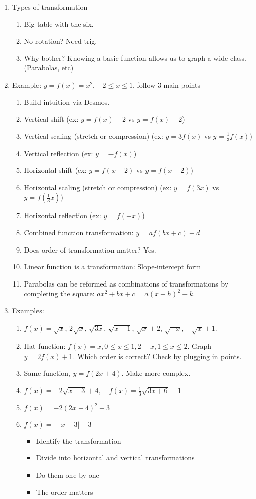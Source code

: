 \documentclass{article}
\begin{document}
\begin{enumerate}
\item Types of transformation
\begin{enumerate}
\item Big table with the six.
\item No rotation? Need trig.
\item Why bother? Knowing a basic function allows us to graph a wide class. (Parabolas, etc)
\end{enumerate}

\item Example: $y=f(x)=x^2$, $-2\leq x \leq 1$, follow 3 main points
\begin{enumerate}
\item Build intuition via Desmos. 
\item Vertical shift (ex: $y=f(x)-2$ vs $y=f(x)+2$)
\item Vertical scaling (stretch or compression) (ex: $y=3f(x)$ vs $y=\frac{1}{3}f(x)$)
\item Vertical reflection (ex: $y=-f(x)$)
\item Horizontal shift (ex: $y=f(x-2)$ vs $y=f(x+2)$)
\item Horizontal scaling (stretch or compression) (ex: $y=f(3x)$ vs $y=f(\frac{1}{3}x)$)
\item Horizontal reflection (ex: $y=f(-x)$)
\item Combined function transformation: $y=af(bx+c)+d$
\item Does order of transformation matter? Yes.
\item Linear function is a transformation: Slope-intercept form
\item Parabolas can be reformed as combinations of transformations by completing the square: $ax^2+bx+c=a(x-h)^2+k$.
\end{enumerate}

\item Examples:
\begin{enumerate}
\item $f(x)=\sqrt{x}$, $2\sqrt{x}$, $\sqrt{3x}$, $\sqrt{x-1}$, $\sqrt{x}+2$, $\sqrt{-x}$, $-\sqrt{x}+1$.
\item Hat function: $f(x) = x, 0\leq x \leq 1, 2-x, 1\leq x \leq 2$. Graph $y=2f(x)+1$. Which order is correct? Check by plugging in points. 
\item Same function, $y=f(2x+4)$. Make more complex.
\item $f(x)=-2\sqrt{x-3}+4, \quad f(x)=\frac{1}{3}\sqrt{3x+6}-1$
\item $f(x)=-2(2x+4)^2+3$
\item $f(x)=-|x-3|-3$
\begin{itemize}
\item Identify the transformation
\item Divide into horizontal and vertical transformations
\item Do them one by one
\item The order matters
\end{itemize}
\end{enumerate}


\end{enumerate}
\end{document}

